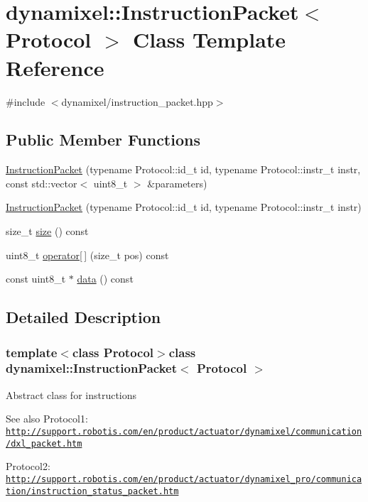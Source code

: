 \hypertarget{classdynamixel_1_1_instruction_packet}{}\section{dynamixel\+:\+:Instruction\+Packet$<$ Protocol $>$ Class Template Reference}
\label{classdynamixel_1_1_instruction_packet}


{\ttfamily \#include $<$dynamixel/instruction\+\_\+packet.\+hpp$>$}

\subsection*{Public Member Functions}
\begin{DoxyCompactItemize}
\item 
\hyperlink{classdynamixel_1_1_instruction_packet_ae625382db5cdf81fae590ce1333876fc}{Instruction\+Packet} (typename Protocol\+::id\+\_\+t id, typename Protocol\+::instr\+\_\+t instr, const std\+::vector$<$ uint8\+\_\+t $>$ \&parameters)
\item 
\hyperlink{classdynamixel_1_1_instruction_packet_acf0044f4cf51aa48cff9309dea20dfcb}{Instruction\+Packet} (typename Protocol\+::id\+\_\+t id, typename Protocol\+::instr\+\_\+t instr)
\item 
size\+\_\+t \hyperlink{classdynamixel_1_1_instruction_packet_ae4fc2dccdf71efe15934fce93e1b7222}{size} () const 
\item 
uint8\+\_\+t \hyperlink{classdynamixel_1_1_instruction_packet_a3558052abebd5412847bb2c2652f2897}{operator\mbox{[}$\,$\mbox{]}} (size\+\_\+t pos) const 
\item 
const uint8\+\_\+t $\ast$ \hyperlink{classdynamixel_1_1_instruction_packet_a9a642ac2e80dc38172166b0508101bb8}{data} () const 
\end{DoxyCompactItemize}


\subsection{Detailed Description}
\subsubsection*{template$<$class Protocol$>$class dynamixel\+::\+Instruction\+Packet$<$ Protocol $>$}

Abstract class for instructions \begin{DoxySeeAlso}{See also}
Protocol1\+: \href{http://support.robotis.com/en/product/actuator/dynamixel/communication/dxl_packet.htm}{\tt http\+://support.\+robotis.\+com/en/product/actuator/dynamixel/communication/dxl\+\_\+packet.\+htm} 

Protocol2\+: \href{http://support.robotis.com/en/product/actuator/dynamixel_pro/communication/instruction_status_packet.htm}{\tt http\+://support.\+robotis.\+com/en/product/actuator/dynamixel\+\_\+pro/communication/instruction\+\_\+status\+\_\+packet.\+htm} 
\end{DoxySeeAlso}


